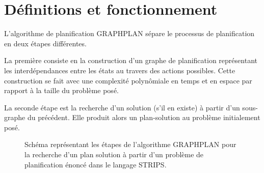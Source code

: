 \minitoc 



\section{Définitions et fonctionnement}

L'algorithme de planification GRAPHPLAN sépare le processus de planification en deux étapes différentes.

La première consiste en la construction d'un graphe de planification représentant les interdépendances entre les états au travers des actions possibles. Cette construction se fait avec une complexité polynômiale en temps et en espace par rapport à la taille du problème posé. 

La seconde étape est la recherche d'un solution (s'il en existe) à partir d'un sous-graphe du précédent. Elle produit alors un plan-solution au problème initialement posé. 

\begin{figure}[htpb]
    \centering
    \caption{Schéma représentant les étapes de l'algorithme GRAPHPLAN pour la recherche d'un plan solution à partir d'un problème de planification énoncé dans le langage STRIPS.}
    \label{fig:pipeline-GRAPHPLAN}
\end{figure}

